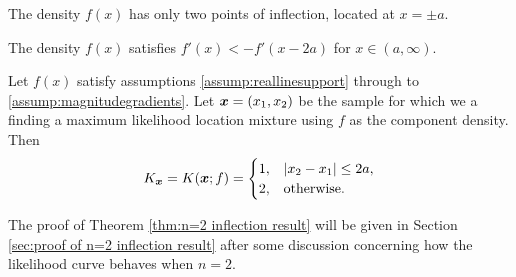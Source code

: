 		\begin{assumption}
			The density $f(x)$ has only two points of inflection, located at $x = \pm a$.
			\label{assump:twoinflectionpoints}
		\end{assumption}


			
		
		\begin{assumption}
			The density $f(x)$ satisfies $f'(x) < -f'(x - 2a)$ for $x \in (a,\infty)$.
			\label{assump:magnitudegradients}
		\end{assumption}

		\begin{theorem}
			\label{thm:n=2 inflection result}
			Let $f(x)$ satisfy assumptions \ref{assump:reallinesupport} through to \ref{assump:magnitudegradients}. Let ${\bm{{x}}} = (x_1,x_2)$ be the sample for which we a finding a maximum likelihood location mixture using $f$ as the component density. Then 
			\begin{equation}
				K_{\bm{{x}}} = K({\bm{{x}}};f) = 
					\begin{cases}
						1, &|x_2 - x_1| \leq 2a,\\
						2, &\text{otherwise.}
					\end{cases}
			\end{equation}
		\end{theorem}

		The proof of Theorem \ref{thm:n=2 inflection result} will be given in Section \ref{sec:proof of n=2 inflection result} after some discussion concerning how the likelihood curve behaves when $n = 2$.

